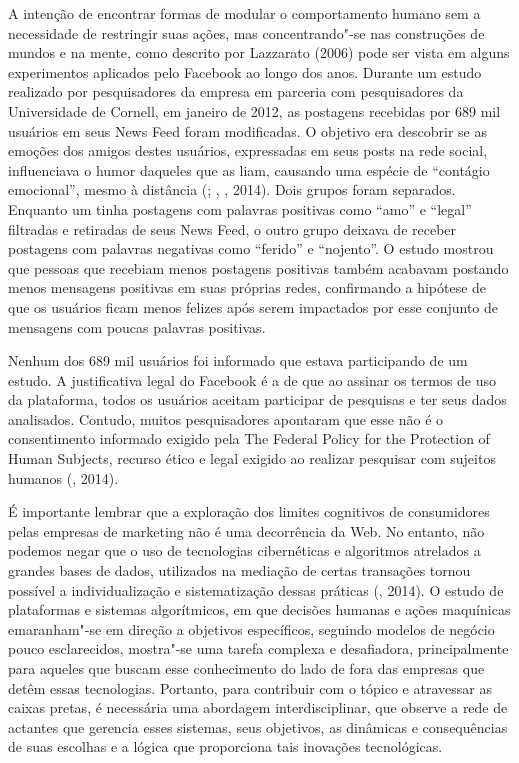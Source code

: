 A intenção de encontrar formas de modular o comportamento humano sem a
necessidade de restringir suas ações, mas concentrando"-se nas
construções de mundos e na mente, como descrito por Lazzarato (2006)
pode ser vista em alguns experimentos aplicados pelo Facebook ao longo
dos anos. Durante um estudo realizado por pesquisadores da empresa em
parceria com pesquisadores da Universidade de Cornell, em janeiro de
2012, as postagens recebidas por 689 mil usuários em seus News Feed
foram modificadas. O objetivo era descobrir se as emoções dos amigos
destes usuários, expressadas em seus posts na rede social, influenciava
o humor daqueles que as liam, causando uma espécie de ``contágio
emocional'', mesmo à distância (; , , 2014). Dois
grupos foram separados. Enquanto um tinha postagens com palavras
positivas como ``amo'' e ``legal'' filtradas e retiradas de seus News
Feed, o outro grupo deixava de receber postagens com palavras negativas
como ``ferido'' e ``nojento''. O estudo mostrou que pessoas que recebiam
menos postagens positivas também acabavam postando menos mensagens
positivas em suas próprias redes, confirmando a hipótese de que os
usuários ficam menos felizes após serem impactados por esse conjunto de
mensagens com poucas palavras positivas.

Nenhum dos 689 mil usuários foi informado que estava participando de um
estudo. A justificativa legal do Facebook é a de que ao assinar os
termos de uso da plataforma, todos os usuários aceitam participar de
pesquisas e ter seus dados analisados. Contudo, muitos pesquisadores
apontaram que esse não é o consentimento informado exigido pela The
Federal Policy for the Protection of Human Subjects, recurso ético e
legal exigido ao realizar pesquisar com sujeitos humanos (, 2014).

É importante lembrar que a exploração dos limites cognitivos de
consumidores pelas empresas de marketing não é uma decorrência da Web.
No entanto, não podemos negar que o uso de tecnologias cibernéticas e
algoritmos atrelados a grandes bases de dados, utilizados na mediação de
certas transações tornou possível a individualização e sistematização
dessas práticas (, 2014). O estudo de plataformas e sistemas
algorítmicos, em que decisões humanas e ações maquínicas emaranham"-se em
direção a objetivos específicos, seguindo modelos de negócio pouco
esclarecidos, mostra"-se uma tarefa complexa e desafiadora,
principalmente para aqueles que buscam esse conhecimento do lado de fora
das empresas que detêm essas tecnologias. Portanto, para contribuir com
o tópico e atravessar as caixas pretas, é necessária uma abordagem
interdisciplinar, que observe a rede de actantes que gerencia esses
sistemas, seus objetivos, as dinâmicas e consequências de suas escolhas
e a lógica que proporciona tais inovações tecnológicas.

